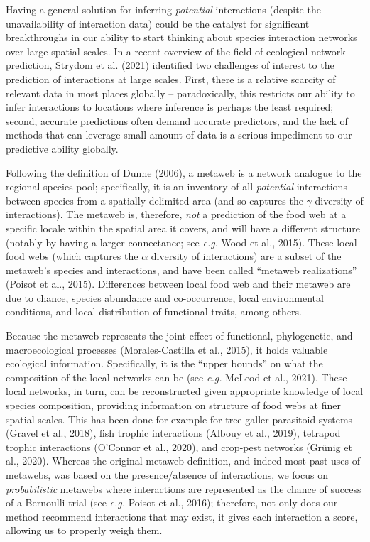 \documentclass[11pt]{article}
\begin{document}
\vfill

\clearpage
\linenumbers
\pagestyle{normal}

Having a general solution for inferring \emph{potential} interactions
(despite the unavailability of interaction data) could be the catalyst
for significant breakthroughs in our ability to start thinking about
species interaction networks over large spatial scales. In a recent
overview of the field of ecological network prediction, Strydom et al.
(2021) identified two challenges of interest to the prediction of
interactions at large scales. First, there is a relative scarcity of
relevant data in most places globally -- paradoxically, this restricts
our ability to infer interactions to locations where inference is
perhaps the least required; second, accurate predictions often demand
accurate predictors, and the lack of methods that can leverage small
amount of data is a serious impediment to our predictive ability
globally.

Following the definition of Dunne (2006), a metaweb is a network
analogue to the regional species pool; specifically, it is an inventory
of all \emph{potential} interactions between species from a spatially
delimited area (and so captures the \(\gamma\) diversity of
interactions). The metaweb is, therefore, \emph{not} a prediction of the
food web at a specific locale within the spatial area it covers, and
will have a different structure (notably by having a larger connectance;
see \emph{e.g.} Wood et al., 2015). These local food webs (which
captures the \(\alpha\) diversity of interactions) are a subset of the
metaweb's species and interactions, and have been called ``metaweb
realizations'' (Poisot et al., 2015). Differences between local food web
and their metaweb are due to chance, species abundance and
co-occurrence, local environmental conditions, and local distribution of
functional traits, among others.

Because the metaweb represents the joint effect of functional,
phylogenetic, and macroecological processes (Morales-Castilla et al.,
2015), it holds valuable ecological information. Specifically, it is the
``upper bounds'' on what the composition of the local networks can be
(see \emph{e.g.} McLeod et al., 2021). These local networks, in turn,
can be reconstructed given appropriate knowledge of local species
composition, providing information on structure of food webs at finer
spatial scales. This has been done for example for
tree-galler-parasitoid systems (Gravel et al., 2018), fish trophic
interactions (Albouy et al., 2019), tetrapod trophic interactions
(O'Connor et al., 2020), and crop-pest networks (Grünig et al., 2020).
Whereas the original metaweb definition, and indeed most past uses of
metawebs, was based on the presence/absence of interactions, we focus on
\emph{probabilistic} metawebs where interactions are represented as the
chance of success of a Bernoulli trial (see \emph{e.g.} Poisot et al.,
2016); therefore, not only does our method recommend interactions that
may exist, it gives each interaction a score, allowing us to properly
weigh them.
\end{document}
